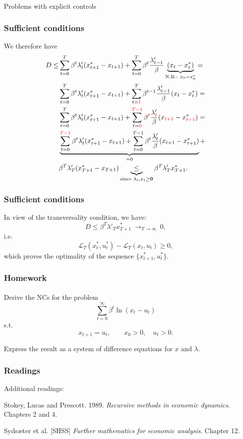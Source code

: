 \documentclass[10pt]{beamer}
\theoremstyle{definition}
\begin{document}
\begin{section}{Problems with explicit controls}
\begin{frame}[fragile]
\frametitle{Sufficient conditions}
We therefore have \begin{equation*}
\begin{split}
 D \leq &   \sum_{t=0}^{T}\beta^t \lambda'_t  (x^*_{t+1} - x_{t+1} ) +  \sum_{t=0}^{T}\beta^t \frac{\lambda'_{t-1}}{\beta}\underbrace{(x_t-x_t^*)}_{\text{N.B.: } x_0 = x^*_0} = \\
&  \sum_{t=0}^{T}\beta^t \lambda'_t  (x^*_{t+1} - x_{t+1} ) +  \sum_{t = {\color{red}1}}^{T}\beta^{t-1} \frac{\lambda'_{t-1}}{\beta}(x_t-x_t^*)= \\
&  \sum_{t=0}^{T}\beta^t \lambda'_t  (x^*_{t+1} - x_{t+1} ) +  \sum_{t = {\color{red} 0}}^{{\color{red} T-1}}\beta^{{\color{red} t}} \frac{\lambda'_{{\color{red} t}}}{\beta}(x_{{\color{red} t+1}}-x_{{\color{red} t+1}}^*)= \\
& \underbrace{\sum_{t=0}^{{\color{red} T-1}}\beta^t \lambda'_t  (x^*_{t+1} - x_{t+1}) +  \sum_{t = 0}^{T-1}\beta^{t} \frac{\lambda'_{t}}{\beta}(x_{ t+1}-x_{t+1}^*)}_{=0} + \\
& \beta^T \lambda'_T  (x^*_{T+1} - x_{T+1})  \underbrace{\leq}_{\text{since }\lambda_t,x_t \geq \mathbf{0}} \beta^T \lambda'_T  x^*_{T+1}.
\end{split}
\end{equation*}
\end{frame}


\begin{frame}[fragile]
\frametitle{Sufficient conditions}
In view of the transversality condition, we have: \begin{equation*}
 D \leq  \beta^T \lambda'_T  x^*_{T+1} ~ \mathop{\longrightarrow}_{T \rightarrow \infty} ~0 ,
\end{equation*}
i.e. 
\[  \mathcal{L}_T(x^*_t,u^*_t) - \mathcal{L}_T (x_t,u_t) \geq 0, \] which proves the optimality of the sequence
$\{x^*_{t+1},u^*_t\}$.
\end{frame}
\end{section}

\begin{frame}[fragile]
\frametitle{Homework}
\framesubtitle{}
Derive the NCs for the problem 
\[ \sum_{t=0}^{\infty}\beta^t \ln (x_t-u_t) \]
s.t.
\[ x_{t+1}=u_t,\qquad x_0>0,\quad u_t>0. \]

Express the result as a system of difference equations for $ x $ and $ \lambda $.
\end{frame}


\begin{frame}[fragile]
\frametitle{Readings}
Additional readings:\bigskip

Stokey, Lucas and Prescott. 1989. \emph{Recursive methods in economic dynamics}. Chapters 2 and 4.\bigskip

Syds\ae{}ter et al. [SHSS] \emph{Further mathematics for economic analysis}. Chapter 12.\bigskip
\end{frame}
\end{document}
